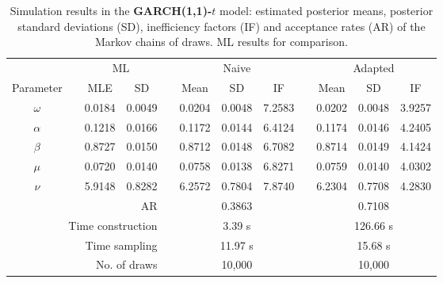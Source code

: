 { \renewcommand{\arraystretch}{1.3} 
\begin{table}[h] 
\centering 
\caption{Simulation results in the \textbf{GARCH(1,1)-$t$} model: estimated posterior means, posterior standard deviations (SD), inefficiency factors (IF) and acceptance rates (AR) of the Markov chains of draws. ML results for comparison.} 
\label{tab:posterior_t_garch2_noS} 
\begin{tabular}{cc rr c rrr c rrr}  
 & & \multicolumn{2}{c}{ML} & & \multicolumn{3}{c}{Naive} & & \multicolumn{3}{c}{Adapted} \\  \cline{3-4} \cline{6-8} \cline{10-12} 
 Parameter & &  \multicolumn{1}{c}{MLE} &  \multicolumn{1}{c}{SD}  & &  \multicolumn{1}{c}{Mean} &  \multicolumn{1}{c}{SD} &  \multicolumn{1}{c}{IF} & &  \multicolumn{1}{c}{Mean} &  \multicolumn{1}{c}{SD} &  \multicolumn{1}{c}{IF} \\ \cline{1-1}  \cline{3-4} \cline{6-8} \cline{10-12}  
$\omega$ & & 0.0184 &  0.0049 & & 0.0204 &  0.0048 &  7.2583 & & 0.0202 &  0.0048 &  3.9257 \\ [1ex] 
$\alpha$ & & 0.1218 &  0.0166 & & 0.1172 &  0.0144 &  6.4124 & & 0.1174 &  0.0146 &  4.2405 \\ [1ex] 
$\beta$ & & 0.8727 &  0.0150 & & 0.8712 &  0.0148 &  6.7082 & & 0.8714 &  0.0149 &  4.1424 \\ [1ex] 
$\mu$ & & 0.0720 &  0.0140 & & 0.0758 &  0.0138 &  6.8271 & & 0.0759 &  0.0140 &  4.0302 \\ [1ex] 
$\nu$ & & 5.9148 &  0.8282 & & 6.2572 &  0.7804 &  7.8740 & & 6.2304 &  0.7708 &  4.2830 \\ [1ex] 
\cline{1-1}  \cline{3-4} \cline{6-8} \cline{10-12}   
\multicolumn{4}{r}{AR} & &\multicolumn{3}{c}{0.3863} &&\multicolumn{3}{c}{0.7108} \\ 
  \cline{1-4} \cline{6-8} \cline{10-12}  
 \multicolumn{4}{r}{Time construction} & &\multicolumn{3}{c}{3.39 s} &&\multicolumn{3}{c}{126.66 s} \\ 
   \multicolumn{4}{r}{Time sampling} & &\multicolumn{3}{c}{11.97 s} &&\multicolumn{3}{c}{15.68 s} \\ 
   \multicolumn{4}{r}{No. of draws }& &\multicolumn{3}{c}{10,000} &&\multicolumn{3}{c}{10,000} \\ 
  \cline{1-4} \cline{6-8} \cline{10-12} 
\hline 
\end{tabular} 
\end{table} 
} 
